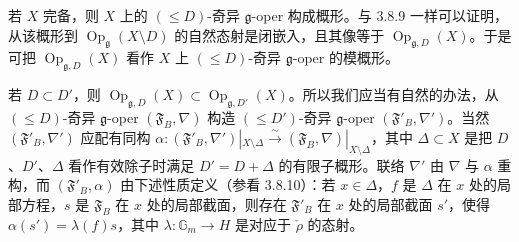 若 $X$ 完备，则 $X$ 上的 $(\le D)$-奇异 $\mathfrak{g}$-oper 构成概形。与 3.8.9 一样可以证明，从该概形到 $\operatorname{Op}_{\mathfrak{g}}(X\setminus D)$ 的自然态射是闭嵌入，且其像等于 $\operatorname{Op}_{\mathfrak{g},D}(X)$。于是可把 $\operatorname{Op}_{\mathfrak{g},D}(X)$ 看作 $X$ 上 $(\le D)$-奇异 $\mathfrak{g}$-oper 的模概形。

若 $D\subset D'$，则 $\operatorname{Op}_{\mathfrak{g},D}(X)\subset\operatorname{Op}_{\mathfrak{g},D'}(X)$。所以我们应当有自然的办法，从 $(\le D)$-奇异 $\mathfrak{g}$-oper $(\mathfrak{F}_{B},\nabla)$ 构造 $(\le D')$-奇异 $\mathfrak{g}$-oper $(\mathfrak{F}'_{B},\nabla')$。当然 $(\mathfrak{F}'_{B},\nabla')$ 应配有同构 $\alpha:(\mathfrak{F}'_{B},\nabla')|_{X\setminus\Delta}\xrightarrow{\sim}(\mathfrak{F}_{B},\nabla)|_{X\setminus\Delta}$，其中 $\Delta\subset X$ 是把 $D$、$D'$、$\Delta$ 看作有效除子时满足 $D'=D+\Delta$ 的有限子概形。联络 $\nabla'$ 由 $\nabla$ 与 $\alpha$ 重构，而 $(\mathfrak{F}'_{B},\alpha)$ 由下述性质定义（参看 3.8.10）：若 $x\in\Delta$，$f$ 是 $\Delta$ 在 $x$ 处的局部方程，$s$ 是 $\mathfrak{F}_{B}$ 在 $x$ 处的局部截面，则存在 $\mathfrak{F}'_{B}$ 在 $x$ 处的局部截面 $s'$，使得 $\alpha(s')=\lambda(f)s$，其中 $\lambda:\mathbb{G}_{m}\to H$ 是对应于 $\check\rho$ 的态射。
